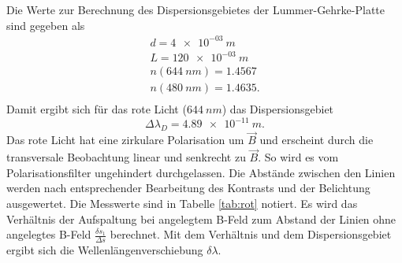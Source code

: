 Die Werte zur Berechnung des Dispersionsgebietes der Lummer-Gehrke-Platte sind gegeben als
\begin{align*}
d         = \SI{4 e-03}{m}    \\
L         = \SI{120 e-03}{m}    \\
n(\SI{644}{nm})  = 1.4567    \\
n(\SI{480}{nm})  = 1.4635.    \\
\end{align*}
Damit ergibt sich für das rote Licht ($\SI{644}{nm}$) das Dispersionsgebiet
\begin{equation*}
  \Delta \lambda_D = \SI{4.89e-11}{m}.
\end{equation*}
Das rote Licht hat eine zirkulare Polarisation um $\vec{B}$ und erscheint durch die transversale Beobachtung linear und senkrecht zu $\vec{B}$.
So wird es vom Polarisationsfilter ungehindert durchgelassen.
Die Abstände zwischen den Linien werden nach entsprechender Bearbeitung des Kontrasts und der Belichtung ausgewertet.
Die Messwerte sind in Tabelle \ref{tab:rot} notiert.
Es wird das Verhältnis der Aufspaltung bei angelegtem B-Feld zum Abstand der Linien ohne angelegtes B-Feld $\frac{\delta s_{1}}{\Delta s}$ berechnet.
Mit dem Verhältnis und dem Dispersionsgebiet ergibt sich die Wellenlängenverschiebung $\delta \lambda$.
%
%

